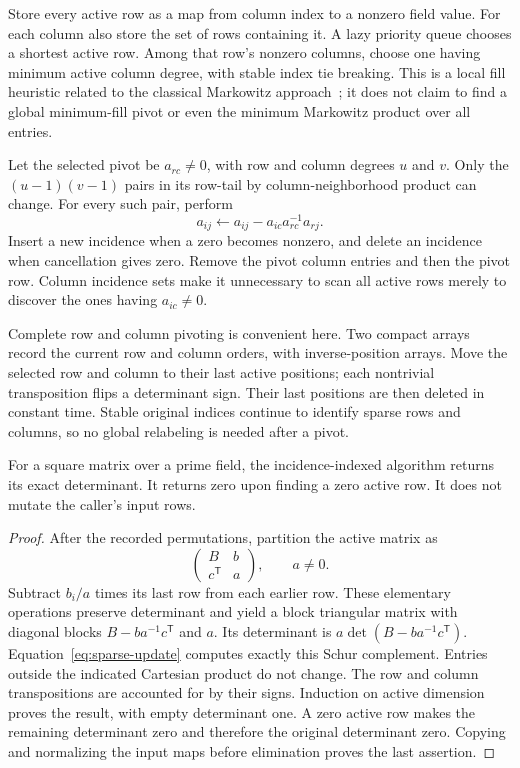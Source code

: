 Store every active row as a map from column index to a nonzero field value.
For each column also store the set of rows containing it.  A lazy priority
queue chooses a shortest active row.  Among that row's nonzero columns,
choose one having minimum active column degree, with stable index tie
breaking.  This is a local fill heuristic related to the classical
Markowitz approach~\cite{markowitz}; it does not claim to find a global
minimum-fill pivot or even the minimum Markowitz product over all entries.

Let the selected pivot be $a_{rc}\ne0$, with row and column degrees $u$ and
$v$.  Only the $(u-1)(v-1)$ pairs in its row-tail by column-neighborhood
product can change.  For every such pair, perform
\begin{equation}
 a_{ij}\leftarrow a_{ij}-a_{ic}a_{rc}^{-1}a_{rj}.
 \label{eq:sparse-update}
\end{equation}
Insert a new incidence when a zero becomes nonzero, and delete an incidence
when cancellation gives zero.  Remove the pivot column entries and then the
pivot row.  Column incidence sets make it unnecessary to scan all active
rows merely to discover the ones having $a_{ic}\ne0$.

Complete row and column pivoting is convenient here.  Two compact arrays
record the current row and column orders, with inverse-position arrays.
Move the selected row and column to their last active positions; each
nontrivial transposition flips a determinant sign.  Their last positions
are then deleted in constant time.  Stable original indices continue to
identify sparse rows and columns, so no global relabeling is needed after
a pivot.

\begin{proposition}
\label{prop:sparse-correct}
For a square matrix over a prime field, the incidence-indexed algorithm
returns its exact determinant.  It returns zero upon finding a zero active
row.  It does not mutate the caller's input rows.
\end{proposition}

\begin{proof}
After the recorded permutations, partition the active matrix as
\[
 \begin{pmatrix}B&b\\c^{\mathsf T}&a\end{pmatrix},\qquad a\ne0.
\]
Subtract $b_i/a$ times its last row from each earlier row.  These elementary
operations preserve determinant and yield a block triangular matrix with
diagonal blocks $B-ba^{-1}c^{\mathsf T}$ and $a$.  Its determinant is
$a\det(B-ba^{-1}c^{\mathsf T})$.  Equation~\eqref{eq:sparse-update}
computes exactly this Schur complement.  Entries outside the indicated
Cartesian product do not change.  The row and column transpositions are
accounted for by their signs.  Induction on active dimension proves the
result, with empty determinant one.  A zero active row makes the remaining
determinant zero and therefore the original determinant zero.  Copying and
normalizing the input maps before elimination proves the last assertion.
\end{proof}

